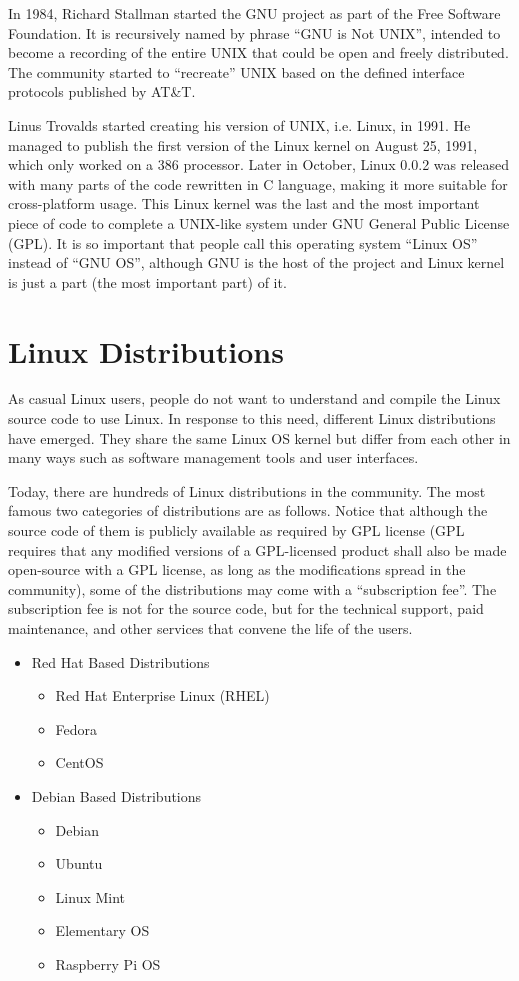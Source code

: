 In 1984, Richard Stallman started the GNU project as part of the Free Software Foundation. It is recursively named by phrase ``GNU is Not UNIX'', intended to become a recording of the entire UNIX that could be open and freely distributed. The community started to ``recreate'' UNIX based on the defined interface protocols published by AT\&T.

Linus Trovalds started creating his version of UNIX, i.e. Linux, in 1991. He managed to publish the first version of the Linux kernel on August 25, 1991, which only worked on a 386 processor. Later in October, Linux 0.0.2 was released with many parts of the code rewritten in C language, making it more suitable for cross-platform usage. This Linux kernel was the last and the most important piece of code to complete a UNIX-like system under GNU General Public License (GPL). It is so important that people call this operating system ``Linux OS'' instead of ``GNU OS'', although GNU is the host of the project and Linux kernel is just a part (the most important part) of it.

\section{Linux Distributions}

As casual Linux users, people do not want to understand and compile the Linux source code to use Linux. In response to this need, different Linux distributions have emerged. They share the same Linux OS kernel but differ from each other in many ways such as software management tools and user interfaces.

Today, there are hundreds of Linux distributions in the community. The most famous two categories of distributions are as follows. Notice that although the source code of them is publicly available as required by GPL license (GPL requires that any modified versions of a GPL-licensed product shall also be made open-source with a GPL license, as long as the modifications spread in the community), some of the distributions may come with a ``subscription fee''. The subscription fee is not for the source code, but for the technical support, paid maintenance, and other services that convene the life of the users.
\begin{itemize}
  \item Red Hat Based Distributions
  \begin{itemize}
    \item Red Hat Enterprise Linux (RHEL)
    \item Fedora
    \item CentOS
  \end{itemize}
  \item Debian Based Distributions
  \begin{itemize}
    \item Debian
    \item Ubuntu
    \item Linux Mint
    \item Elementary OS
    \item Raspberry Pi OS
  \end{itemize}
\end{itemize}

